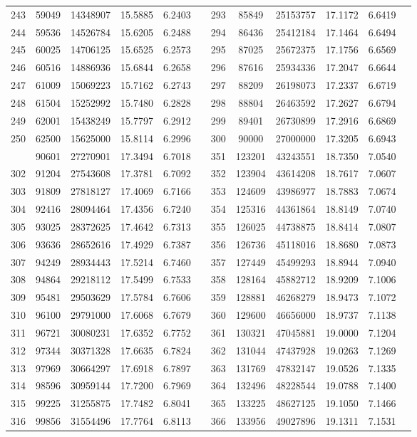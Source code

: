 \begin{longtable}{SSSSSSSSSSSS}
243&59049&14348907&15.5885&6.2403&&293&85849&25153757&17.1172&6.6419\\
244&59536&14526784&15.6205&6.2488&&294&86436&25412184&17.1464&6.6494\\
245&60025&14706125&15.6525&6.2573&&295&87025&25672375&17.1756&6.6569\\
246&60516&14886936&15.6844&6.2658&&296&87616&25934336&17.2047&6.6644\\
247&61009&15069223&15.7162&6.2743&&297&88209&26198073&17.2337&6.6719\\
248&61504&15252992&15.7480&6.2828&&298&88804&26463592&17.2627&6.6794\\
249&62001&15438249&15.7797&6.2912&&299&89401&26730899&17.2916&6.6869\\
250&62500&15625000&15.8114&6.2996&&300&90000&27000000&17.3205&6.6943\\
&90601&27270901&17.3494&6.7018&&351&123201&43243551&18.7350&7.0540\\
302&91204&27543608&17.3781&6.7092&&352&123904&43614208&18.7617&7.0607\\
303&91809&27818127&17.4069&6.7166&&353&124609&43986977&18.7883&7.0674\\
304&92416&28094464&17.4356&6.7240&&354&125316&44361864&18.8149&7.0740\\
305&93025&28372625&17.4642&6.7313&&355&126025&44738875&18.8414&7.0807\\
306&93636&28652616&17.4929&6.7387&&356&126736&45118016&18.8680&7.0873\\
307&94249&28934443&17.5214&6.7460&&357&127449&45499293&18.8944&7.0940\\
308&94864&29218112&17.5499&6.7533&&358&128164&45882712&18.9209&7.1006\\
309&95481&29503629&17.5784&6.7606&&359&128881&46268279&18.9473&7.1072\\
310&96100&29791000&17.6068&6.7679&&360&129600&46656000&18.9737&7.1138\\
311&96721&30080231&17.6352&6.7752&&361&130321&47045881&19.0000&7.1204\\
312&97344&30371328&17.6635&6.7824&&362&131044&47437928&19.0263&7.1269\\
313&97969&30664297&17.6918&6.7897&&363&131769&47832147&19.0526&7.1335\\
314&98596&30959144&17.7200&6.7969&&364&132496&48228544&19.0788&7.1400\\
315&99225&31255875&17.7482&6.8041&&365&133225&48627125&19.1050&7.1466\\
316&99856&31554496&17.7764&6.8113&&366&133956&49027896&19.1311&7.1531\\

\end{longtable}

